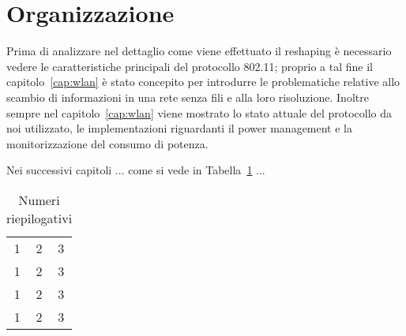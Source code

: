\section{Organizzazione}\label{sez:organizzazione}

Prima di analizzare nel dettaglio come viene effettuato il reshaping \`e necessario vedere le
caratteristiche principali del protocollo 802.11; proprio a tal fine il capitolo~\ref{cap:wlan} \`e stato
concepito per introdurre le problematiche relative allo scambio di informazioni in una rete senza fili e
alla loro risoluzione. Inoltre sempre nel capitolo~\ref{cap:wlan} viene mostrato lo stato attuale del
protocollo da noi utilizzato, le implementazioni riguardanti il power management e la monitorizzazione del
consumo di potenza.

Nei successivi capitoli ... come si vede in Tabella~\ref{tab:numeri} ...

\begin{table}[h]
\begin{center}
\begin{tabular}{|c|c|c|}
\hline
1 & 2 & 3 \\
1 & 2 & 3 \\
1 & 2 & 3 \\
1 & 2 & 3 \\
\hline
\end{tabular}
\end{center}
\caption{Numeri riepilogativi}
\label{tab:numeri}
\end{table}
